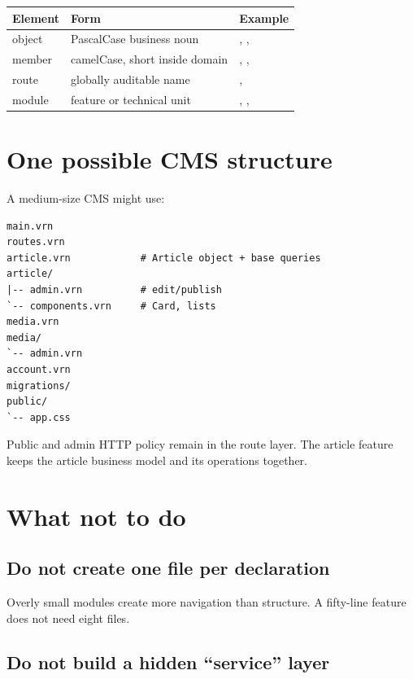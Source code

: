 \begin{center}
\begin{tabularx}{\textwidth}{@{}l l Y@{}}
\toprule
\textbf{Element} & \textbf{Form} & \textbf{Example} \\
\midrule
object & PascalCase business noun & , ,  \\
member & camelCase, short inside domain & , ,  \\
route & globally auditable name & ,  \\
module & feature or technical unit & , ,  \\
\bottomrule
\end{tabularx}
\end{center}

\section{One possible CMS structure}

A medium-size CMS might use:

\begin{lstlisting}
main.vrn
routes.vrn
article.vrn            # Article object + base queries
article/
|-- admin.vrn          # edit/publish
`-- components.vrn     # Card, lists
media.vrn
media/
`-- admin.vrn
account.vrn
migrations/
public/
`-- app.css
\end{lstlisting}

Public and admin HTTP policy remain in the route layer. The article feature keeps the article business model and its operations together.

\section{What not to do}

\subsection*{Do not create one file per declaration}

Overly small modules create more navigation than structure. A fifty-line feature does not need eight files.

\subsection*{Do not build a hidden ``service'' layer}

